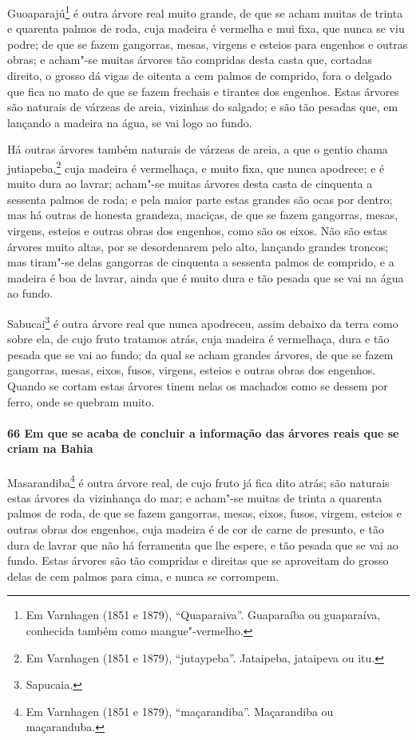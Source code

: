 \begin{linenumbers}
Guoaparajú\footnote{ Em Varnhagen (1851 e 1879), ``Quaparaiva''. Guaparaíba ou guaparaíva,
conhecida também como mangue"-vermelho.} é outra árvore real muito grande, de que se acham
muitas de trinta e quarenta palmos de roda, cuja madeira é vermelha e mui fixa, que nunca
se viu podre; de que se fazem gangorras, mesas, virgens e esteios para engenhos e outras
obras; e acham"-se muitas árvores tão compridas desta casta que, cortadas direito, o grosso
dá vigas de oitenta a cem palmos de comprido, fora o delgado que fica no mato de que se
fazem frechais e tirantes dos engenhos. Estas árvores são naturais de várzeas de areia,
vizinhas do salgado; e são tão pesadas que, em lançando a madeira na água, se vai logo ao
fundo.

Há outras árvores também naturais de várzeas de areia, a que o gentio chama
jutiapeba,\footnote{ Em Varnhagen (1851 e 1879), ``jutaypeba''. Jataipeba, jataipeva ou
itu.} cuja madeira é vermelhaça, e muito fixa, que nunca apodrece; e é muito dura ao
lavrar; acham"-se muitas árvores desta casta de cinquenta a sessenta palmos de roda; e pela
maior parte estas grandes são ocas por dentro; mas há outras de honesta grandeza, maciças,
de que se fazem gangorras, mesas, virgens, esteios e outras obras dos engenhos, como são
os eixos. Não são estas árvores muito altas, por se desordenarem pelo alto, lançando
grandes troncos; mas tiram"-se delas gangorras de cinquenta a sessenta palmos de comprido,
e a madeira é boa de lavrar, ainda que é muito dura e tão pesada que se vai na água ao
fundo.

Sabucai\footnote{ Sapucaia.} é outra árvore real que nunca apodreceu, assim debaixo da
terra como sobre ela, de cujo fruto tratamos atrás, cuja madeira é vermelhaça, dura e tão
pesada que se vai ao fundo; da qual se acham grandes árvores, de que se fazem gangorras,
mesas, eixos, fusos, virgens, esteios e outras obras dos engenhos. Quando se cortam estas
árvores tinem nelas os machados como se dessem por ferro, onde se quebram muito.

\paragraph{66 Em que se acaba de concluir a informação das árvores reais que se criam na
Bahia}\quad
Masarandiba\footnote{ Em Varnhagen (1851 e 1879), ``maçarandiba''. Maçarandiba ou
maçaranduba.} é outra árvore real, de cujo fruto já fica dito atrás; são naturais estas
árvores da vizinhança do mar; e acham"-se muitas de trinta a quarenta palmos de roda, de
que se fazem gangorras, mesas, eixos, fusos, virgem, esteios e outras obras dos engenhos,
cuja madeira é de cor de carne de presunto, e tão dura de lavrar que não há ferramenta que
lhe espere, e tão pesada que se vai ao fundo. Estas árvores são tão compridas e direitas
que se aproveitam do grosso delas de cem palmos para cima, e nunca se corrompem.


\end{linenumbers}
